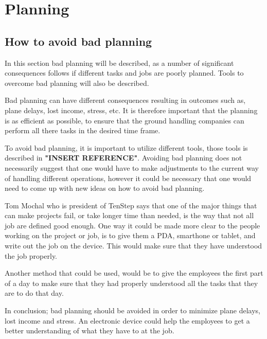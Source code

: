 \chapter{Planning}
\section{How to avoid bad planning}
In this section bad planning will be described, as a number of significant consequences follows if different tasks and jobs are poorly planned. Tools to overcome bad planning will also be described.

Bad planning can have different consequences resulting in outcomes such as, plane delays, lost income, stress, etc\cite{BadPlan_CEN12LA007}. It is therefore important that the planning is as efficient as possible, to ensure that the ground handling companies can perform all there tasks in the desired time frame.

To avoid bad planning, it is important to utilize different tools, those  tools is described in \textbf{"INSERT REFERENCE"}. Avoiding bad planning does not necessarily suggest that one would have to make adjustments to the current way of handling different operations, however it could be necessary that one would need to come up with new ideas on how to avoid bad planning.

Tom Mochal who is president of TenStep \cite{AvoidP_TenStep} says that one of the major things that can make projects fail, or take longer time than needed, is the way that not all job are defined good enough. One way it could be made more clear to the people working on the project or job, is to give them a PDA, smarthone or tablet, and write out the job on the device. This would make sure that they have understood the job properly.


Another method that could be used, would be to give the employees the first part of a day to make sure that they had properly understood all the tasks that they are to do that day.

In conclusion; bad planning should be avoided in order to minimize plane delays, lost income and stress. An electronic device could help the employees to get a better understanding of what they have to at the job. 